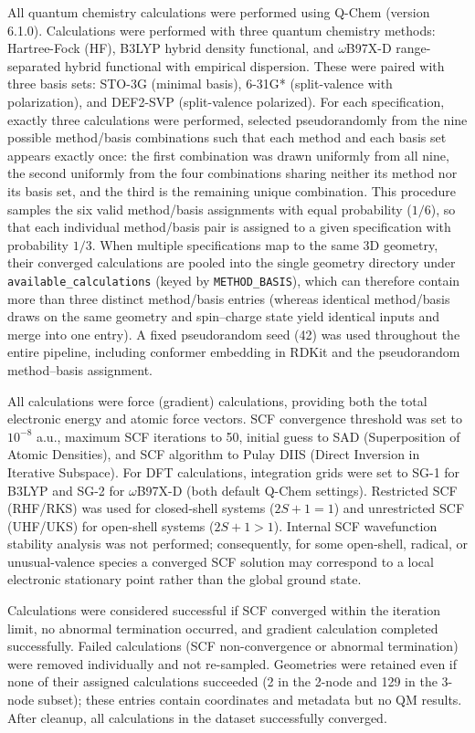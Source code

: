\documentclass[fleqn,10pt]{article}
\begin{document}
All quantum chemistry calculations were performed using Q-Chem\cite{qchem} (version 6.1.0). Calculations were performed with three quantum chemistry methods: Hartree-Fock (HF), B3LYP\cite{b3lyp} hybrid density functional, and $\omega$B97X-D\cite{wb97xd} range-separated hybrid functional with empirical dispersion. These were paired with three basis sets: STO-3G (minimal basis), 6-31G* (split-valence with polarization), and DEF2-SVP (split-valence polarized). For each specification, exactly three calculations were performed, selected pseudorandomly from the nine possible method/basis combinations such that each method and each basis set appears exactly once: the first combination was drawn uniformly from all nine, the second uniformly from the four combinations sharing neither its method nor its basis set, and the third is the remaining unique combination. This procedure samples the six valid method/basis assignments with equal probability ($1/6$), so that each individual method/basis pair is assigned to a given specification with probability $1/3$. When multiple specifications map to the same 3D geometry, their converged calculations are pooled into the single geometry directory under \texttt{available\_calculations} (keyed by \texttt{METHOD\_BASIS}), which can therefore contain more than three distinct method/basis entries (whereas identical method/basis draws on the same geometry and spin--charge state yield identical inputs and merge into one entry). A fixed pseudorandom seed (42) was used throughout the entire pipeline, including conformer embedding in RDKit and the pseudorandom method--basis assignment.


All calculations were force (gradient) calculations, providing both the total electronic energy and atomic force vectors. SCF convergence threshold was set to $10^{-8}$ a.u., maximum SCF iterations to 50, initial guess to SAD (Superposition of Atomic Densities), and SCF algorithm to Pulay DIIS (Direct Inversion in Iterative Subspace). For DFT calculations, integration grids were set to SG-1 for B3LYP and SG-2 for $\omega$B97X-D (both default Q-Chem settings). Restricted SCF (RHF/RKS) was used for closed-shell systems ($2S+1 = 1$) and unrestricted SCF (UHF/UKS) for open-shell systems ($2S+1 > 1$). Internal SCF wavefunction stability analysis was not performed; consequently, for some open-shell, radical, or unusual-valence species a converged SCF solution may correspond to a local electronic stationary point rather than the global ground state.

Calculations were considered successful if SCF converged within the iteration limit, no abnormal termination occurred, and gradient calculation completed successfully. Failed calculations (SCF non-convergence or abnormal termination) were removed individually and not re-sampled. Geometries were retained even if none of their assigned calculations succeeded (2 in the 2-node and 129 in the 3-node subset); these entries contain coordinates and metadata but no QM results. After cleanup, all calculations in the dataset successfully converged.
\end{document}
